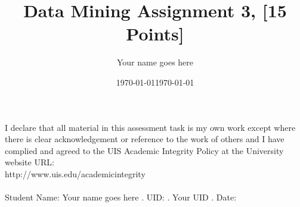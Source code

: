 \documentclass[12pt]{article} %
\title{Data Mining Assignment 3,     [15 Points]}
\author{\color{red} Your name goes here}\color{black}
\date{\today}                                           %
\begin{document}
\maketitle
I declare that all material in this assessment task is my own work except where there is clear acknowledgement or reference to the work of others and I have complied and agreed to the UIS Academic Integrity Policy at the University website URL:\\ http://www.uis.edu/academicintegrity\\\\
Student Name: 
\color{white} \color{red} Your name goes here\color{white} .\color{black}
UID: 
\color{white} .\color{red} Your UID \color{white}. \color{black} Date: \date{\today}
\end{document}
